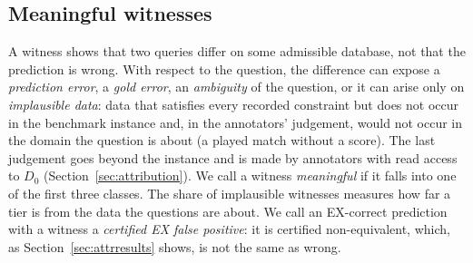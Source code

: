 \subsection{Meaningful witnesses}\label{sec:meaningful}
A witness shows that two queries differ on some admissible database, not that the prediction is wrong. With respect to the question, the difference can expose a \emph{prediction error}, a \emph{gold error}, an \emph{ambiguity} of the question, or it can arise only on \emph{implausible data}: data that satisfies every recorded constraint but does not occur in the benchmark instance and, in the annotators' judgement, would not occur in the domain the question is about (a played match without a score). The last judgement goes beyond the instance and is made by annotators with read access to $D_0$ (Section~\ref{sec:attribution}). We call a witness \emph{meaningful} if it falls into one of the first three classes. The share of implausible witnesses measures how far a tier is from the data the questions are about. We call an EX-correct prediction with a witness a \emph{certified EX false positive}: it is certified non-equivalent, which, as Section~\ref{sec:attrresults} shows, is not the same as wrong.
